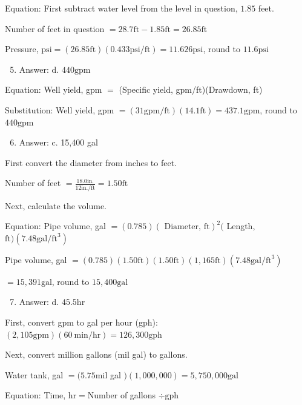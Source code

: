 \documentclass[10pt]{article}
\begin{document}
Equation: First subtract water level from the level in question, $1.85$ feet.

Number of feet in question $=28.7 \mathrm{ft}-1.85 \mathrm{ft}=26.85 \mathrm{ft}$

Pressure, $\mathrm{psi}=(26.85 \mathrm{ft})(0.433 \mathrm{psi} / \mathrm{ft})=11.626 \mathrm{psi}$, round to $11.6 \mathrm{psi}$

\begin{enumerate}
  \setcounter{enumi}{4}
  \item Answer: d. $440 \mathrm{gpm}$
\end{enumerate}

Equation: Well yield, gpm $=$ (Specific yield, gpm/ft)(Drawdown, ft)

Substitution: Well yield, gpm $=(31 \mathrm{gpm} / \mathrm{ft})(14.1 \mathrm{ft})=437.1 \mathrm{gpm}$, round to $440 \mathrm{gpm}$

\begin{enumerate}
  \setcounter{enumi}{5}
  \item Answer: c. 15,400 gal
\end{enumerate}

First convert the diameter from inches to feet.

Number of feet $=\frac{18.0 \mathrm{in} .}{12 \mathrm{in} . / \mathrm{ft}}=1.50 \mathrm{ft}$

Next, calculate the volume.

Equation: Pipe volume, gal $=(0.785)(\text { Diameter, } \mathrm{ft})^{2}($ Length, $\mathrm{ft})\left(7.48 \mathrm{gal} / \mathrm{ft}^{3}\right)$

Pipe volume, gal $=(0.785)(1.50 \mathrm{ft})(1.50 \mathrm{ft})(1,165 \mathrm{ft})\left(7.48 \mathrm{gal} / \mathrm{ft}^{3}\right)$

$=15,391 \mathrm{gal}$, round to $15,400 \mathrm{gal}$

\begin{enumerate}
  \setcounter{enumi}{6}
  \item Answer: d. $45.5 \mathrm{hr}$
\end{enumerate}

First, convert gpm to gal per hour (gph): $(2,105 \mathrm{gpm})(60 \mathrm{~min} / \mathrm{hr})=126,300 \mathrm{gph}$

Next, convert million gallons (mil gal) to gallons.

Water tank, gal $=(5.75 \mathrm{mil}$ gal $)(1,000,000)=5,750,000 \mathrm{gal}$

Equation: Time, $\mathrm{hr}=\mathrm{Number}$ of gallons $\div \mathrm{gph}$
\end{document}

